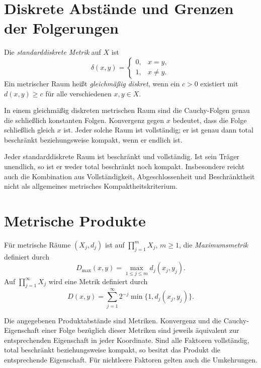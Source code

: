 \section{Diskrete Abstände und Grenzen der Folgerungen}

\begin{definition}
Die \emph{standarddiskrete Metrik} auf $X$ ist
\[
 \delta(x,y)=\begin{cases}0,&x=y,\\1,&x\ne y.\end{cases}
\]
Ein metrischer Raum heißt \emph{gleichmäßig diskret}, wenn ein $c>0$
existiert mit $d(x,y)\geq c$ für alle verschiedenen $x,y\in X$.
\end{definition}

\begin{theorem}
In einem gleichmäßig diskreten metrischen Raum sind die Cauchy-Folgen
genau die schließlich konstanten Folgen. Konvergenz gegen $x$ bedeutet,
dass die Folge schließlich gleich $x$ ist. Jeder solche Raum ist
vollständig; er ist genau dann total beschränkt beziehungsweise kompakt,
wenn er endlich ist.
\end{theorem}

\begin{theorem}
Jeder standarddiskrete Raum ist beschränkt und vollständig. Ist sein
Träger unendlich, so ist er weder total beschränkt noch kompakt.
Insbesondere reicht auch die Kombination aus Vollständigkeit,
Abgeschlossenheit und Beschränktheit nicht als allgemeines metrisches
Kompaktheitskriterium. \cite{project}
\end{theorem}
\section{Metrische Produkte}

\begin{definition}
Für metrische Räume $(X_j,d_j)$ ist auf $\prod_{j=1}^{m}X_j$, $m\geq1$,
die \emph{Maximumsmetrik} definiert durch
\[
 D_{\max}(x,y)=\max_{1\leq j\leq m}d_j(x_j,y_j).
\]
Auf $\prod_{j=1}^{\infty}X_j$ wird eine Metrik definiert durch
\[
 D(x,y)=\sum_{j=1}^{\infty}2^{-j}\min\{1,d_j(x_j,y_j)\}.
\]
\end{definition}

\begin{theorem}
\label{b47guide:thm:products}
Die angegebenen Produktabstände sind Metriken. Konvergenz und die
Cauchy-Eigenschaft einer Folge bezüglich dieser Metriken sind jeweils
äquivalent zur entsprechenden Eigenschaft in jeder Koordinate.
Sind alle Faktoren vollständig, total beschränkt beziehungsweise kompakt,
so besitzt das Produkt die entsprechende Eigenschaft. Für nichtleere
Faktoren gelten auch die Umkehrungen. \cite{product-notes}
\end{theorem}